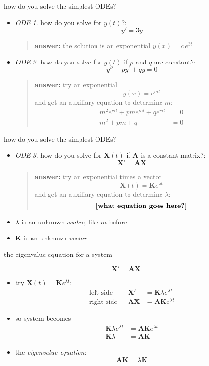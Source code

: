 \documentclass[urlcolor=blue,dvipsnames]{beamer}
\newcommand{\bA}{\mathbf{A}}
\newcommand{\bK}{\mathbf{K}}
\newcommand{\bX}{\mathbf{X}}
\begin{document}
\begin{frame}{how do you solve the simplest ODEs?}

\begin{itemize}
\item \emph{ODE 1}.  how do you solve for $y(t)$?:
    $$y'=3y$$
    \begin{quote}
    \textbf{answer:}  the solution is an exponential $y(x) = c\, e^{3t}$
    \end{quote}
\item \emph{ODE 2}.  how do you solve for $y(t)$ if $p$ and $q$ are constant?:
    $$y'' + p y' + q y = 0$$
    \begin{quote}
    \textbf{answer:}  try an exponential
        $$y(x) = e^{mt}$$
    and get an auxiliary equation to determine $m$:
\begin{align*}
m^2 e^{mt} + p m e^{mt} + q e^{mt} &= 0 \\
m^2 + p m + q &= 0
\end{align*}
    \end{quote}
\end{itemize}
\end{frame}


\begin{frame}{how do you solve the simplest ODEs?}

\begin{itemize}
\item \emph{ODE 3}.  how do you solve for $\bX(t)$ if $\bA$ is a constant matrix?:
    $$\bX' = \bA \bX$$
    \begin{quote}
    \textbf{answer:}  try an exponential times a vector
        $$\bX(t) = \bK e^{\lambda t}$$
    and get an auxiliary equation to determine $\lambda$:
        $$\text{\textbf{[what equation goes here?]}}$$
    \end{quote}
\item $\lambda$ is an unknown \emph{scalar}, like $m$ before
\item $\bK$ is an unknown \emph{vector}
\end{itemize}
\end{frame}


\begin{frame}{the eigenvalue equation for a system}

    $$\bX' = \bA \bX$$

\bigskip
\begin{itemize}
\item try \quad $\bX(t) = \bK e^{\lambda t}$:
    \begin{align*}
         \text{left side}&  & \bX' &= \bK \lambda e^{\lambda t} \\
        \text{right side}&  & \bA\bX &= \bA \bK e^{\lambda t}
    \end{align*}
\item so system becomes
\begin{align*}
    \bK \lambda e^{\lambda t} &= \bA \bK e^{\lambda t} \\
    \bK \lambda &= \bA \bK
\end{align*}
\item the \emph{eigenvalue equation}:
    $$\boxed{\bA \bK = \lambda \bK}$$
\end{itemize}
\end{frame}
\end{document}
